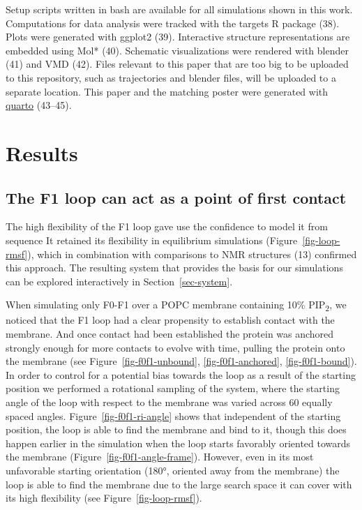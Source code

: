\documentclass[
  twocolumn]{biophys-new-mod}
\begin{document}
Setup scripts written in bash are available for all simulations shown in
this work. Computations for data analysis were tracked with the targets
R package (38). Plots were generated with ggplot2 (39). Interactive
structure representations are embedded using Mol* (40). Schematic
visualizations were rendered with blender (41) and VMD (42). Files
relevant to this paper that are too big to be uploaded to this
repository, such as trajectories and blender files, will be uploaded to
a separate location. This paper and the matching poster were generated
with \href{https://quarto.org/}{quarto} (43--45).

\hypertarget{results}{%
\section{Results}\label{results}}

\hypertarget{the-f1-loop-can-act-as-a-point-of-first-contact}{%
\subsection{The F1 loop can act as a point of first
contact}\label{the-f1-loop-can-act-as-a-point-of-first-contact}}

The high flexibility of the F1 loop gave use the confidence to model it
from sequence It retained its flexibility in equilibrium simulations
(Figure~\ref{fig-loop-rmsf}), which in combination with comparisons to
NMR structures (13) confirmed this approach. The resulting system that
provides the basis for our simulations can be explored interactively in
Section~\ref{sec-system}.

When simulating only F0-F1 over a POPC membrane containing 10\%
PIP\textsubscript{2}, we noticed that the F1 loop had a clear propensity
to establish contact with the membrane. And once contact had been
established the protein was anchored strongly enough for more contacts
to evolve with time, pulling the protein onto the membrane (see
Figure~\ref{fig-f0f1-unbound}, \ref{fig-f0f1-anchored}, \ref{fig-f0f1-bound}).
In order to control for a potential bias towards the loop as a result of
the starting position we performed a rotational sampling of the system,
where the starting angle of the loop with respect to the membrane was
varied across 60 equally spaced angles. Figure~\ref{fig-f0f1-ri-angle}
shows that independent of the starting position, the loop is able to
find the membrane and bind to it, though this does happen earlier in the
simulation when the loop starts favorably oriented towards the membrane
(Figure~\ref{fig-f0f1-angle-frame}). However, even in its most
unfavorable starting orientation (180°, oriented away from the membrane)
the loop is able to find the membrane due to the large search space it
can cover with its high flexibility (see Figure~\ref{fig-loop-rmsf}).
\end{document}
